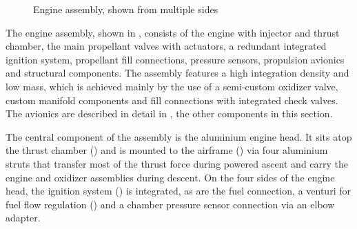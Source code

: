 \begin{figure}[H]
\centering
{}
\caption{Engine assembly, shown from multiple sides}
\label{fig:sysarch_prop_engineAssy}
\end{figure}

The engine assembly, shown in , consists of the engine with injector and thrust chamber, the  main propellant valves with actuators, a redundant integrated ignition system, propellant fill connections, pressure sensors, propulsion avionics and structural components. The assembly features a high integration density and low mass, which is achieved mainly by the use of a semi-custom oxidizer valve, custom manifold components and fill connections with integrated check valves. The avionics are described in detail in , the other components in this section.

The central component of the assembly is the aluminium engine head. It sits atop the thrust chamber () and is mounted to the airframe () via four aluminium struts that transfer most of the thrust force during powered ascent and carry the engine and oxidizer assemblies during descent. On the four sides of the engine head, the ignition system () is integrated, as are the fuel connection, a venturi for fuel flow regulation () and a chamber pressure sensor connection via an elbow adapter.

